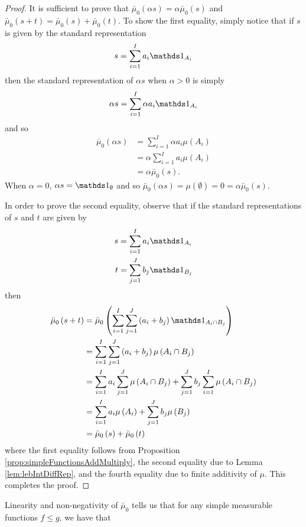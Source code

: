 \begin{proof}
It is sufficient to prove that $\bar{\mu}_{0}\left(\alpha s\right)=\alpha\bar{\mu}_{0}\left(s\right)$
and $\bar{\mu}_{0}\left(s+t\right)=\bar{\mu}_{0}\left(s\right)+\bar{\mu}_{0}\left(t\right).$
To show the first equality, simply notice that if $s$ is given by
the standard representation 
\[
s=\sum_{i=1}^{I}a_{i}\indicate_{A_{i}}
\]
then the standard representation of $\alpha s$ when $\alpha>0$ is
simply
\[
\alpha s=\sum_{i=1}^{I}\alpha a_{i}\indicate_{A_{i}}
\]
and so 
\begin{align*}
\bar{\mu}_{0}\left(\alpha s\right) & =\sum_{i=1}^{I}\alpha a_{i}\mu\left(A_{i}\right)\\
 & =\alpha\sum_{i=1}^{I}a_{i}\mu\left(A_{i}\right)\\
 & =\alpha\bar{\mu}_{0}\left(s\right).
\end{align*}
When $\alpha=0$, $\alpha s=\indicate_{\emptyset}$ and so $\bar{\mu}_{0}\left(\alpha s\right)=\mu\left(\emptyset\right)=0=\alpha\bar{\mu}_{0}\left(s\right).$

In order to prove the second equality, observe that if the standard
representations of $s$ and $t$ are given by
\begin{align*}
s & =\sum_{i=1}^{I}a_{i}\indicate_{A_{i}}\\
t & =\sum_{j=1}^{J}b_{j}\indicate_{B_{j}}
\end{align*}
then
\begin{align*}
\bar{\mu}_{0}\left(s+t\right) & =\bar{\mu}_{0}\left(\sum_{i=1}^{I}\sum_{j=1}^{J}\left(a_{i}+b_{j}\right)\indicate_{A_{i}\cap B_{j}}\right)\\
 & =\sum_{i=1}^{I}\sum_{j=1}^{J}\left(a_{i}+b_{j}\right)\mu\left(A_{i}\cap B_{j}\right)\\
 & =\sum_{i=1}^{I}a_{i}\sum_{j=1}^{J}\mu\left(A_{i}\cap B_{j}\right)+\sum_{j=1}^{J}b_{j}\sum_{i=1}^{I}\mu\left(A_{i}\cap B_{j}\right)\\
 & =\sum_{i=1}^{I}a_{i}\mu\left(A_{i}\right)+\sum_{j=1}^{J}b_{j}\mu\left(B_{j}\right)\\
 & =\bar{\mu}_{0}\left(s\right)+\bar{\mu}_{0}\left(t\right)
\end{align*}
where the first equality follows from Proposition \ref{prop:simpleFunctionsAddMultiply},
the second equality due to Lemma \ref{lem:lebIntDiffRep}, and the
fourth equality due to finite additivity of $\mu$. This completes
the proof.
\end{proof}
Linearity and non-negativity of $\bar{\mu}_{0}$ tells us that for
any simple measurable functions $f\leq g$, we have that
